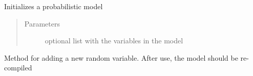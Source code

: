 \documentclass[letterpaper,10pt,english]{sphinxmanual}
\begin{document}
\begin{fulllineitems}
\begin{sphinxVerbatim}[commandchars=\\\{\}]
     
          \PYG{p}{[} \PYG{p}{]}  






   
    




\end{sphinxVerbatim}

\begin{fulllineitems}
\label{\detokenize{modules/inferpy.models:inferpy.models.prob_model.ProbModel.__init__}}
Initializes a probabilistic model
\begin{quote}\begin{description}
\item[{Parameters}] \leavevmode
{} \textendash{} optional list with the variables in the model

\end{description}\end{quote}

\end{fulllineitems}


\begin{fulllineitems}
\label{\detokenize{modules/inferpy.models:inferpy.models.prob_model.ProbModel.add_var}}
Method for adding a new random variable. After use, the model should be re-compiled


\end{fulllineitems}
\end{fulllineitems}
\end{document}
